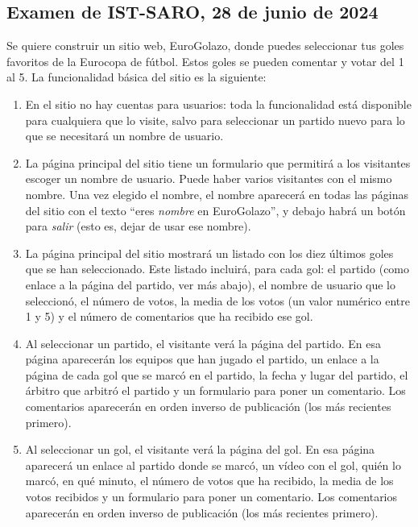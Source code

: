 
\subsection{Examen de IST-SARO, 28 de junio de 2024}

Se quiere construir un sitio web, EuroGolazo, donde puedes seleccionar tus goles favoritos de la Eurocopa de fútbol. Estos goles se pueden comentar y votar del 1 al 5. La funcionalidad básica del sitio es la siguiente:

\begin{enumerate}
  \item En el sitio no hay cuentas para usuarios: toda la funcionalidad está disponible para cualquiera que lo visite, salvo para seleccionar un partido nuevo para lo que se necesitará un nombre de usuario.
  \item La página principal del sitio tiene un formulario que permitirá a los visitantes escoger un nombre de usuario. Puede haber varios visitantes con el mismo nombre. Una vez elegido el nombre, el nombre aparecerá en todas las páginas del sitio con el texto ``eres \emph{nombre} en EuroGolazo'', y debajo habrá un botón para \emph{salir} (esto es, dejar de usar ese nombre).
  \item La página principal del sitio mostrará un listado con los diez últimos goles que se han seleccionado. Este listado incluirá, para cada gol: el partido (como enlace a la página del partido, ver más abajo), el nombre de usuario que lo seleccionó, el número de votos, la media de los votos (un valor numérico entre 1 y 5) y el número de comentarios que ha recibido ese gol.
  \item Al seleccionar un partido, el visitante verá la página del partido. En esa página aparecerán los equipos que han jugado el partido, un enlace a la página de cada gol que se marcó en el partido, la fecha y lugar del partido, el árbitro que arbitró el partido y un formulario para poner un comentario. Los comentarios aparecerán en orden inverso de publicación (los más recientes primero).
  \item Al seleccionar un gol, el visitante verá la página del gol. En esa página aparecerá un enlace al partido donde se marcó, un vídeo con el gol, quién lo marcó, en qué minuto, el número de votos que ha recibido, la media de los votos recibidos y un formulario para poner un comentario. Los comentarios aparecerán en orden inverso de publicación (los más recientes primero).

\end{enumerate}
